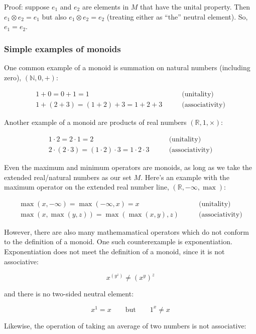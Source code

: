 \documentclass[
]{book}
\theoremstyle{definition}
\theoremstyle{definition}
\theoremstyle{definition}
\theoremstyle{definition}
\theoremstyle{remark}
\begin{document}
Proof: suppose \(e_1\) and \(e_2\) are elements in \(M\) that have the unital property. Then \(e_1 \otimes e_2 = e_1\) but also \(e_1 \otimes e_2 = e_2\) (treating either as ``the'' neutral element). So, \(e_1 = e_2\).

\subsubsection{Simple examples of monoids}\label{simple-examples-of-monoids}

One common example of a monoid is summation on natural numbers (including zero), \((\mathbb{N}, 0, +)\):

\begin{align}
1 + 0 = 0 + 1 = 1 & \qquad \text{(unitality)} \\
1 + (2 + 3) = (1 + 2) + 3 = 1 + 2 + 3 & \qquad \text{(associativity)}
\end{align}

Another example of a monoid are products of real numbers \((\mathbb{R}, 1, \times)\):

\begin{align} 
1 \cdot 2 = 2 \cdot 1 = 2 & \qquad \text{(unitality)} \\
2 \cdot (2 \cdot 3) = (1 \cdot 2) \cdot 3 = 1 \cdot 2 \cdot 3 & \qquad \text{(associativity)}
\end{align}

Even the maximum and minimum operators are monoids, as long as we take the extended real/natural numbers as our set \(M\). Here's an example with the maximum operator on the extended real number line, \((\mathbb{R}, -\infty, \max)\):

\begin{align}
\max(x, -\infty) = \max(-\infty, x) = x & \qquad \text{(unitality)} \\
\max(x, \max(y, z)) = \max(\max(x, y), z) & \qquad \text{(associativity)}
\end{align}

However, there are also many mathemamatical operators which do not conform to the definition of a monoid. One such counterexample is exponentiation. Exponentiation does not meet the definition of a monoid, since it is not associative:

\[x^{(y^z)} \neq (x^y)^z\]

and there is no two-sided neutral element:

\[x^1 = x \qquad \text{but} \qquad 1^x \neq x\]

Likewise, the operation of taking an average of two numbers is not associative:
\end{document}
